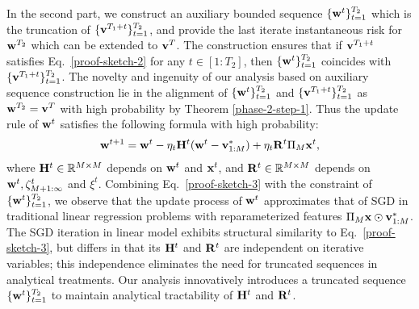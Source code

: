 In the second part, we construct an auxiliary bounded sequence $\{\mathbf{w}^t\}_{t=1}^{T_2}$ which is the truncation of $\{\mathbf{v}^{T_1+t}\}_{t=1}^{T_2}$, and provide the last iterate instantaneous risk for $\mathbf{w}^{T_2}$ which can be extended to $\mathbf{v}^{T}$. The construction ensures that if $\mathbf{v}^{T_1+t}$ satisfies Eq.~\eqref{proof-sketch-2} for any $t\in[1:T_2]$, then $\{\mathbf{w}^t\}_{t=1}^{T_2}$ coincides with $\{\mathbf{v}^{T_1+t}\}_{t=1}^{T_2}$. The novelty and ingenuity of our analysis based on auxiliary sequence construction lie in the alignment of  $\{\mathbf{w}^t\}_{t=1}^{T_2}$ and $\{\mathbf{v}^{T_1+t}\}_{t=1}^{T_2}$ as $\mathbf{w}^{T_2}=\mathbf{v}^{T}$ with high probability by Theorem \ref{phase-2-step-1}. Thus the update rule of $\mathbf{w}^t$ satisfies the following formula with high probability:
\begin{equation}\label{proof-sketch-3}
    \begin{split}
        \mathbf{w}^{t+1}=\mathbf{w}^t-\eta_t\mathbf{H}^t(\mathbf{w}^t-\mathbf{v}_{1:M}^*)+\eta_t\mathbf{R}^t\Pi_M\mathbf{x}^t,
    \end{split}
\end{equation}
where $\mathbf{H}^t\in\mathbb{R}^{M\times M}$ depends on $\mathbf{w}^t$ and $\mathbf{x}^t$, and $\mathbf{R}^t\in\mathbb{R}^{M\times M}$ depends on $\mathbf{w}^t, \zeta_{M+1:\infty}^t$ and $\xi^t$. Combining Eq.~\eqref{proof-sketch-3} with the constraint of $\{\mathbf{w}^t\}_{t=1}^{T_2}$, we observe that the update process of $\mathbf{w}^t$ approximates that of SGD in traditional linear regression problems \citep{wu2022last} with reparameterized features $\Pi_M\mathbf{x}\odot\mathbf{v}_{1:M}^*$. The SGD iteration in linear model exhibits structural similarity to Eq.~\eqref{proof-sketch-3}, but differs in that its $\mathbf{H}^t$ and $\mathbf{R}^t$ are independent on iterative variables; this independence eliminates the need for truncated sequences in analytical treatments. Our analysis innovatively introduces a truncated sequence $\{\mathbf{w}^t\}_{t=1}^{T_2}$ to maintain analytical tractability of $\mathbf{H}^t$ and $\mathbf{R}^t$.

